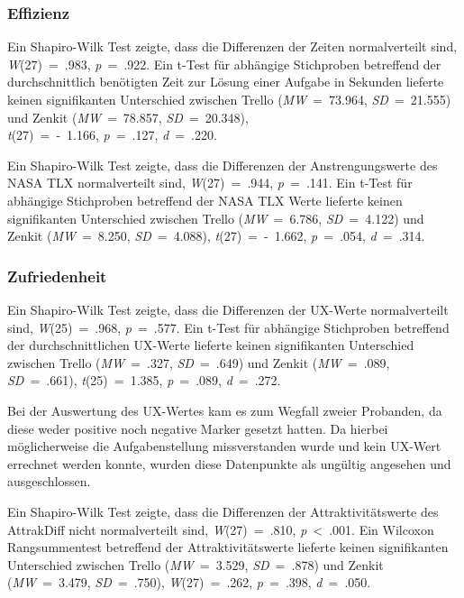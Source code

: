 \subsubsection{Effizienz}
Ein Shapiro-Wilk Test zeigte, dass die Differenzen der Zeiten normalverteilt sind, \textit{W}(27)~=~.983, \textit{p}~=~.922. 
Ein t-Test für abhängige Stichproben betreffend der durchschnittlich benötigten Zeit zur Lösung einer Aufgabe in Sekunden lieferte keinen signifikanten Unterschied zwischen Trello (\textit{MW}~=~73.964, \textit{SD}~=~21.555) und Zenkit (\textit{MW}~=~78.857, \textit{SD}~=~20.348),\\\textit{t}(27)~=~-~1.166, \textit{p}~=~.127, \textit{d}~=~.220.

Ein Shapiro-Wilk Test zeigte, dass die Differenzen der Anstrengungswerte des NASA TLX normalverteilt sind, \textit{W}(27)~=~.944, \textit{p}~=~.141. 
Ein t-Test für abhängige Stichproben betreffend der NASA TLX Werte lieferte keinen signifikanten Unterschied zwischen Trello (\textit{MW}~=~6.786, \textit{SD}~=~4.122) und Zenkit (\textit{MW}~=~8.250, \textit{SD}~=~4.088), \textit{t}(27)~=~-~1.662, \textit{p}~=~.054, \textit{d}~=~.314.




\subsubsection{Zufriedenheit}   
Ein Shapiro-Wilk Test zeigte, dass die Differenzen der UX-Werte normalverteilt sind, \textit{W}(25)~=~.968, \textit{p}~=~.577. 
Ein t-Test für abhängige Stichproben betreffend der durchschnittlichen UX-Werte lieferte keinen signifikanten Unterschied zwischen Trello (\textit{MW}~=~.327, \textit{SD}~=~.649) und Zenkit (\textit{MW}~=~.089, \textit{SD}~=~.661), \textit{t}(25)~=~1.385,
 \textit{p}~=~.089, \textit{d}~=~.272.

Bei der Auswertung des UX-Wertes kam es zum Wegfall zweier Probanden, da diese weder positive noch negative Marker gesetzt hatten. Da hierbei möglicherweise die Aufgabenstellung missverstanden wurde und kein UX-Wert errechnet werden konnte, wurden diese Datenpunkte als ungültig angesehen und ausgeschlossen.

Ein Shapiro-Wilk Test zeigte, dass die Differenzen der Attraktivitätswerte des AttrakDiff nicht normalverteilt sind, \textit{W}(27)~=~.810, \textit{p}~<~.001.
Ein Wilcoxon Rangsummentest betreffend der Attraktivitätswerte lieferte keinen signifikanten Unterschied zwischen Trello (\textit{MW}~=~3.529, \textit{SD}~=~.878) und Zenkit (\textit{MW}~=~3.479, \textit{SD}~=~.750), \textit{W}(27)~=~.262, \textit{p}~=~.398, \textit{d}~=~.050.
